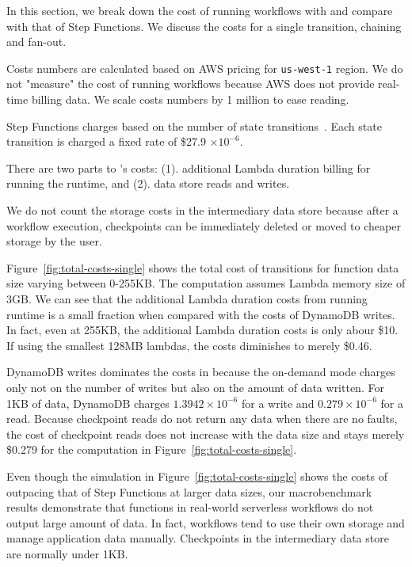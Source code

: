 In this section, we break down the cost of running workflows with \name{} and
compare with that of Step Functions. We discuss the costs for a single transition,
chaining and fan-out.

Costs numbers are calculated based on AWS pricing for \texttt{us-west-1}
region. We do not "measure" the cost of running workflows because AWS does not
provide real-time billing data. We scale costs numbers by 1 million to ease
reading.

Step Functions charges based on the number of state
transitions~\cite{aws-step-functions-pricing}. Each state transition is charged
a fixed rate of \$27.9 $ \times 10^{-6}$.

There are two parts to \name{}'s costs: (1). additional Lambda duration
billing for running the \name{} runtime, and (2). data store reads and writes.

We do not count the storage costs in the intermediary data store because after
a workflow execution, checkpoints can be immediately deleted or moved to
cheaper storage by the user.

Figure~\ref{fig:total-costs-single} shows the total cost of transitions for
function data size varying between 0-255KB. The computation assumes Lambda
memory size of 3GB. We can see that the additional Lambda duration costs from
running \name{} runtime is a small fraction when compared with the costs of
DynamoDB writes. In fact, even at 255KB, the additional Lambda
duration costs is only abour \$10. If using the smallest 128MB lambdas, the
costs diminishes to merely \$0.46.

DynamoDB writes dominates the costs in \name{} because the on-demand mode
charges only not on the number of writes but also on the amount of data
written. For 1KB of data, DynamoDB charges $1.3942 \times 10^{-6}$ for a write
and $0.279 \times 10^{-6}$ for a read. Because checkpoint reads do not return
any data when there are no faults, the cost of checkpoint reads does not
increase with the data size and stays merely \$0.279 for the computation in
Figure~\ref{fig:total-costs-single}.

Even though the simulation in Figure~\ref{fig:total-costs-single} shows the
costs of \name{} outpacing that of Step Functions at larger data sizes, our
macrobenchmark results demonstrate that functions in real-world serverless
workflows do not output large amount of data. In fact, workflows tend to use
their own storage and manage application data manually. Checkpoints in the
\name{} intermediary data store are normally under 1KB.

